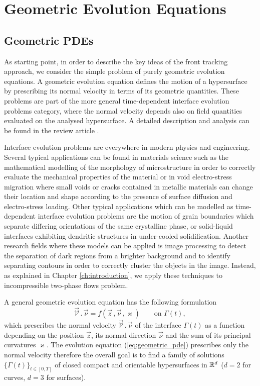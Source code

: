 \chapter{\sc Geometric Evolution Equations}
\label{ch:1}

\section[Geometric PDEs]{Geometric PDEs}
As starting point, in order to describe the key ideas of the front tracking
approach, we consider the simple problem of purely geometric evolution
equations. A geometric evolution equation defines the motion of a hypersurface
by prescribing its normal velocity in terms of its geometric quantities. These
problems are part of the more general time-dependent interface evolution
problems category, where the normal velocity depends also on field quantities
evaluated on the analysed hypersurface. A detailed description and analysis can
be found in the review article \cite{DeckelnickDE05}.

Interface evolution problems are everywhere in modern physics and engineering.
Several typical applications can be found in materials science such as the
mathematical modelling of the morphology of microstructure in order to
correctly evaluate the mechanical properties of the material or in void
electro-stress migration where small voids or cracks contained in metallic
materials can change their location and shape according to the presence of
surface diffusion and electro-stress loading. Other typical applications which
can be modelled as time-dependent interface evolution problems are the motion of
grain boundaries which separate differing orientations of the same crystalline
phase, or solid-liquid interfaces exhibiting dendritic structures in
under-cooled solidification. Another research fields where these models can be
applied is image processing to detect the separation of dark regions from a
brighter background and to identify separating contours in order to correctly
cluster the objects in the image. Instead, as explained in Chapter
\ref{ch:introduction}, we apply these techniques to incompressible two-phase
flows problem.

A general geometric evolution equation has the following formulation
\begin{equation}\label{eq:geometric_pde}
\vec{\mathcal{V}}\,.\,\vec\nu=f(\vec{z}\,,\vec{\nu}\,,\varkappa)
\qquad\mbox{on }\Gamma(t),
\end{equation}
which prescribes the normal velocity $\vec{\mathcal{V}}\,.\,\vec\nu$ of the
interface $\Gamma(t)$ as a function depending on the position $\vec z$, its
normal direction $\vec{\nu}$ and the sum of its principal curvatures
$\varkappa$. The evolution equation (\ref{eq:geometric_pde}) prescribes only
the normal velocity therefore the overall goal is to find a family of
solutions $\{ \Gamma(t) \}_{t \in [0, T]}$ of closed compact and orientable
hypersurfaces in ${\mathbb R}^{d}$ ($d = 2$ for curves, $d = 3$ for surfaces).

